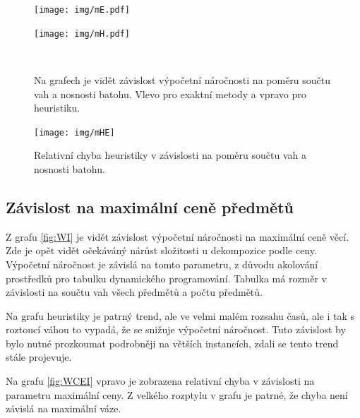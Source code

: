 \documentclass[11pt]{article}
\begin{document}
\begin{figure}
	\centering
    \begin{minipage}[c]{0.49\textwidth}
        \centering\texttt{[image: img/mE.pdf]} 
    \end{minipage}
    \begin{minipage}[c]{0.49\textwidth}
        \centering \texttt{[image: img/mH.pdf]} 
    \end{minipage}
    \\
   \caption{Na grafech je vidět závislost výpočetní náročnosti na poměru součtu vah a nosnosti batohu. Vlevo pro exaktní metody a vpravo pro heuristiku.}\label{fig:mI}
    \end{figure} 
    
    

\begin{figure}\centering
	\texttt{[image: img/mHE]}
 	\caption[1]{Relativní chyba heuristiky v závislosti na poměru součtu vah a nosnosti batohu.}\label{fig:mEI}
 \end{figure} 	

\subsection{Závislost na maximální ceně předmětů}

Z grafu \ref{fig:WI} je vidět závislost výpočetní náročnosti na maximální ceně věcí. Zde je opět vidět očekáváný nárůst složitosti u dekompozice podle ceny. Výpočetní náročnost je závislá na tomto parametru, z důvodu akolování prostředků pro tabulku dynamického programování. Tabulka má rozměr v závislosti na součtu vah všech předmětů a počtu předmětů.

Na grafu heuristiky je patrný trend, ale ve velmi malém rozsahu časů, ale i tak s roztoucí váhou to vypadá, že se snižuje výpočetní náročnost. Tuto závislost by bylo nutné prozkoumat podrobněji na větších instancích, zdali se tento trend stále projevuje.

Na grafu \ref{fig:WCEI} vpravo je zobrazena relativní chyba v závislosti na parametru maximální ceny. Z velkého rozptylu v grafu je patrné, že chyba není závislá na maximální váze. 
\end{document}
